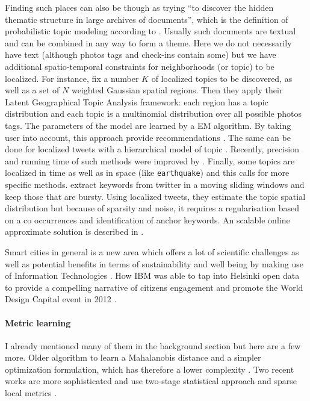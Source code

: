 Finding such places can also be though as trying \enquote{to discover the
hidden thematic structure in large archives of documents}, which is the
definition of probabilistic topic modeling according to \textcite{topicModel}.
Usually such documents are textual and can be combined in any way to form a
theme. Here we do not necessarily have text (although photos tags and check-ins
contain some) but we have additional spatio-temporal constraints for
neighborhoods (or topic) to be localized. For instance,
\textcite{GeoTopicYin11} fix a number $K$ of localized topics to be discovered,
as well as a set of $N$ weighted Gaussian spatial regions. Then they apply
their Latent Geographical Topic Analysis framework: each region has a topic
distribution and each topic is a multinomial distribution over all possible
photos tags. The parameters of the model are learned by a EM algorithm. By
taking user into account, this approach provide recommendations
\cite{GeoTopicKurashima2013}. The same can be done for localized tweets with a
hierarchical model of topic \cite{nestedChinese13}. Recently, precision and
running time of such methods were improved by
\textcite{NonGaussianTopicKling14}. Finally, some topics are localized in time
as well as in space (like \texttt{earthquake}) and this calls for more specific
methods. \Textcite{TwitterBurst13} extract keywords from twitter in a moving
sliding windows and keep those that are bursty. Using localized tweets, they
estimate the topic spatial distribution but because of sparsity and noise, it
requires a regularisation based on a co occurrences and identification of
anchor keywords. An scalable online approximate solution is described in
\autocite{GeoScope}.

Smart cities in general is a new area which offers a lot of scientific
challenges \autocite[Chapter 4]{Eunoia13} as well as potential benefits in
terms of sustainability and well being by making use of Information
Technologies \autocite{SmartCities13}. How IBM was able to tap into Helsinki
open data to provide a compelling narrative of citizens engagement and promote
the World Design Capital event in 2012 \autocite{HelsinkiSCC11}.


\paragraph{Metric learning} I already mentioned many of them in the background
section but here are a few more. Older algorithm to learn a Mahalanobis
distance \autocite{Xing2002} and a simpler optimization formulation, which has
therefore a lower complexity \autocite{Shen2011}. Two recent works are more
sophisticated and use two-stage statistical approach \autocite{Wang2014} and
sparse local metrics \autocite{SparseMetric14}.

